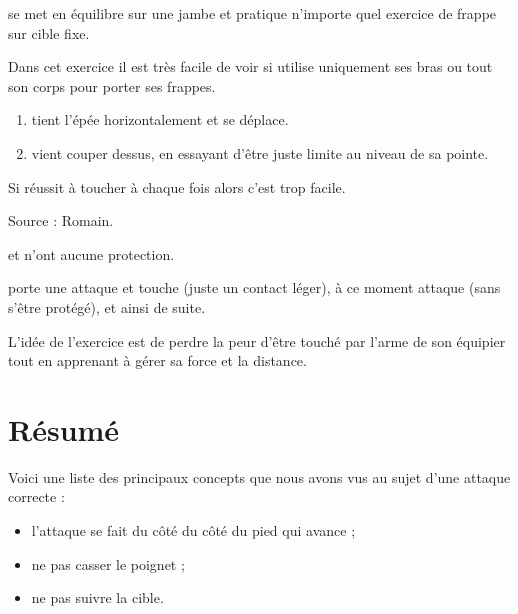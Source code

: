 \begin{exercice}
\A se met en équilibre sur une jambe et pratique n'importe quel exercice de frappe sur cible fixe.

Dans cet exercice il est très facile de voir si \A utilise uniquement ses bras ou tout son corps pour porter ses frappes.
\end{exercice}


\begin{exercice}

\begin{enumerate}
	\item \D tient l'épée horizontalement et se déplace.
	
	\item \A vient couper dessus, en essayant d'être juste limite au niveau de sa pointe.
\end{enumerate}

Si \A réussit à toucher à chaque fois alors c'est trop facile.

Source : Romain.

\end{exercice}


\begin{exercice}
\A et \D n'ont aucune protection.

\A porte une attaque et touche \D (juste un contact léger), à ce moment \D attaque \A (sans s'être protégé), et ainsi de suite.

L'idée de l'exercice est de perdre la peur d'être touché par l'arme de son équipier tout en apprenant à gérer sa force et la distance.
\end{exercice}


\section{Résumé}


\noindent
Voici une liste des principaux concepts que nous avons vus au sujet d'une attaque correcte :
\begin{itemize}
	\item l'attaque se fait du côté du côté du pied qui avance ;
	\item ne pas casser le poignet ;
	\item ne pas suivre la cible.
\end{itemize}


